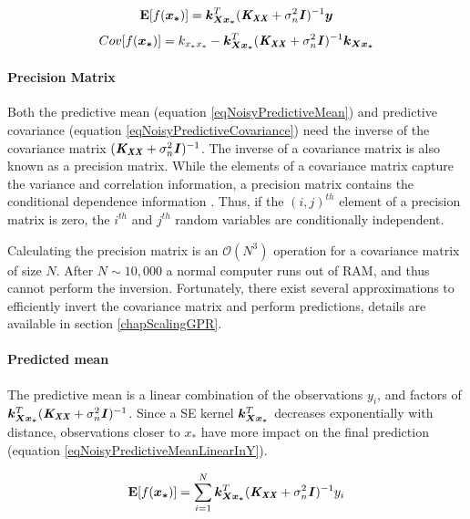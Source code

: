 \begin{equation}\label{eqNoisyPredictiveMean}
  \mathbf{E}[f(\boldsymbol{x_{*}})] = \boldsymbol{k_{Xx_{*}}}^T( \bm{\mathit{K_{XX}}} + \sigma^{2}_{n}\bm{\mathit{I}})^{-1} \boldsymbol{y}
  \end{equation}
  \begin{equation}\label{eqNoisyPredictiveCovariance}
	Cov[f(\boldsymbol{x_{*}})] = k_{x_{*}x_{*}} - \boldsymbol{k_{Xx_{*}}}^{T}( \bm{\mathit{K_{XX}}} + \sigma^{2}_{n}\bm{\mathit{I}} )^{-1} \boldsymbol{k_{Xx_{*}}}
  \end{equation}

\paragraph{Precision Matrix}  
Both the predictive mean (equation \ref{eqNoisyPredictiveMean}) and predictive covariance (equation \ref{eqNoisyPredictiveCovariance}) need the inverse of the covariance matrix $( \bm{\mathit{K_{XX}}} + \sigma^{2}_{n}\bm{\mathit{I}} )^{-1}$. The inverse of a covariance matrix is also known as a precision matrix. While the elements of a covariance matrix capture the variance and correlation information, a precision matrix contains the conditional dependence information \cite{mackay2003information}. Thus, if the $(i, j)^{th}$ element of a precision matrix is zero, the $i^{th}$ and $j^{th}$ random variables are conditionally independent. 

Calculating the precision matrix is an $\mathcal{O}\left ( N^{3} \right )$ operation for a covariance matrix of size $N$. After $N \sim 10,000$ a normal computer runs out of RAM, and thus cannot perform the inversion. Fortunately, there exist several approximations to efficiently invert the covariance matrix and perform predictions, details are available in section \ref{chapScalingGPR}.

\paragraph{Predicted mean}
The predictive mean is a linear combination of the observations $y_{i}$, and factors of $\boldsymbol{k_{Xx_{*}}}^{T}( \bm{\mathit{K_{XX}}} + \sigma^{2}_{n}\bm{\mathit{I}})^{-1}$. Since a SE kernel $\boldsymbol{k_{Xx_{*}}}^{T}$ decreases exponentially with distance, observations closer to $x_{*}$ have more impact on the final prediction (equation \ref{eqNoisyPredictiveMeanLinearInY}). 
  
  \begin{equation}\label{eqNoisyPredictiveMeanLinearInY}
  \mathbf{E}[f(\boldsymbol{x_{*}})] = \sum_{i = 1}^{N} \boldsymbol{k_{Xx_{*}}}^{T}( \bm{\mathit{K_{XX}}} + \sigma^{2}_{n}\bm{\mathit{I}})^{-1} y_{i}
  \end{equation}

